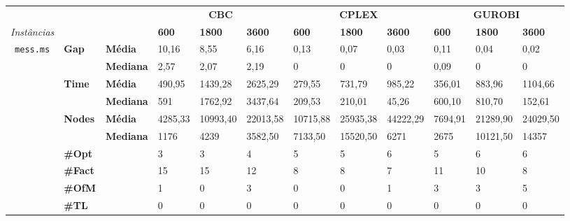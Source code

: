 
	\begin{footnotesize}	
	\caption{}
	\label{cflp:tab:6}
	\begin{tabular}{c@{\hskip 0.2cm}l@{\hskip 0.1cm}l|lll|lll|lll}
	& & & \multicolumn{3}{c}{\textbf{CBC}} & \multicolumn{3}{c}{\textbf{CPLEX}} & \multicolumn{3}{c}{\textbf{GUROBI}} 	\\\textit{Instâncias} & & & \textbf{600} & \textbf{1800} & \textbf{3600} & \textbf{600} & \textbf{1800} & \textbf{3600} & \textbf{600} & \textbf{1800} & \textbf{3600} \\
\hline
\multirow{7}{*}{\texttt{mess.ms}} & \multirow{2}{*}{\textbf{Gap}} & \textbf{Média} & 10,16 & 8,55 & 6,16 & 0,13 & 0,07 & 0,03 & 0,11 & 0,04 & 0,02 \\
 & & \textbf{Mediana} & 2,57 & 2,07 & 2,19 & 0 & 0 & 0 & 0,09 & 0 & 0 \\
\cline{2-12}
 & \multirow{2}{*}{\textbf{Time}} & \textbf{Média} & 490,95 & 1439,28 & 2625,29 & 279,55 & 731,79 & 985,22 & 356,01 & 883,96 & 1104,66 \\
 & & \textbf{Mediana} & 591 & 1762,92 & 3437,64 & 209,53 & 210,01 & 45,26 & 600,10 & 810,70 & 152,61 \\
\cline{2-12}
 & \multirow{2}{*}{\textbf{Nodes}} & \textbf{Média} & 4285,33 & 10993,40 & 22013,58 & 10715,88 & 25935,38 & 44222,29 & 7694,91 & 21289,90 & 24029,50 \\
 & & \textbf{Mediana} & 1176 & 4239 & 3582,50 & 7133,50 & 15520,50 & 6271 & 2675 & 10121,50 & 14357 \\
\cline{2-12}
 & \textbf{\#Opt} & & 3 & 3 & 4 & 5 & 5 & 6 & 5 & 6 & 6 \\
 & \textbf{\#Fact} & & 15 & 15 & 12 & 8 & 8 & 7 & 11 & 10 & 8 \\
 & \textbf{\#OfM} & & 1 & 0 & 3 & 0 & 0 & 1 & 3 & 3 & 5 \\
 & \textbf{\#TL} & & 0 & 0 & 0 & 0 & 0 & 0 & 0 & 0 & 0 \\
	\end{tabular}
	\end{footnotesize}

